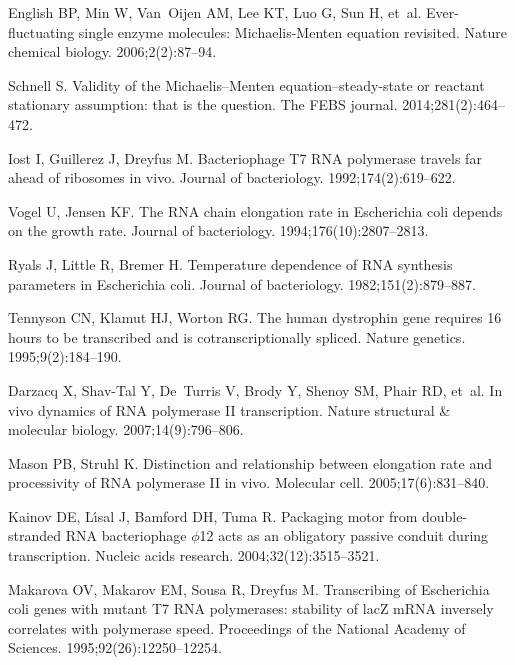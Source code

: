 \documentclass[10pt,letterpaper]{article}
\begin{document}
{{\begin{thebibliography}{10}
English BP, Min W, Van~Oijen AM, Lee KT, Luo G, Sun H, et~al.
\newblock Ever-fluctuating single enzyme molecules: Michaelis-Menten equation
  revisited.
\newblock Nature chemical biology. 2006;2(2):87--94.

Schnell S.
\newblock Validity of the Michaelis--Menten equation--steady-state or reactant
  stationary assumption: that is the question.
\newblock The FEBS journal. 2014;281(2):464--472.

Iost I, Guillerez J, Dreyfus M.
\newblock Bacteriophage T7 RNA polymerase travels far ahead of ribosomes in
  vivo.
\newblock Journal of bacteriology. 1992;174(2):619--622.

Vogel U, Jensen KF.
\newblock The RNA chain elongation rate in Escherichia coli depends on the
  growth rate.
\newblock Journal of bacteriology. 1994;176(10):2807--2813.

Ryals J, Little R, Bremer H.
\newblock Temperature dependence of RNA synthesis parameters in Escherichia
  coli.
\newblock Journal of bacteriology. 1982;151(2):879--887.

Tennyson CN, Klamut HJ, Worton RG.
\newblock The human dystrophin gene requires 16 hours to be transcribed and is
  cotranscriptionally spliced.
\newblock Nature genetics. 1995;9(2):184--190.

Darzacq X, Shav-Tal Y, De~Turris V, Brody Y, Shenoy SM, Phair RD, et~al.
\newblock In vivo dynamics of RNA polymerase II transcription.
\newblock Nature structural \& molecular biology. 2007;14(9):796--806.

Mason PB, Struhl K.
\newblock Distinction and relationship between elongation rate and processivity
  of RNA polymerase II in vivo.
\newblock Molecular cell. 2005;17(6):831--840.

Kainov DE, L{\'\i}sal J, Bamford DH, Tuma R.
\newblock Packaging motor from double-stranded RNA bacteriophage $\phi$12 acts
  as an obligatory passive conduit during transcription.
\newblock Nucleic acids research. 2004;32(12):3515--3521.

Makarova OV, Makarov EM, Sousa R, Dreyfus M.
\newblock Transcribing of Escherichia coli genes with mutant T7 RNA
  polymerases: stability of lacZ mRNA inversely correlates with polymerase
  speed.
\newblock Proceedings of the National Academy of Sciences.
  1995;92(26):12250--12254.


\end{thebibliography}}}
\end{document}
